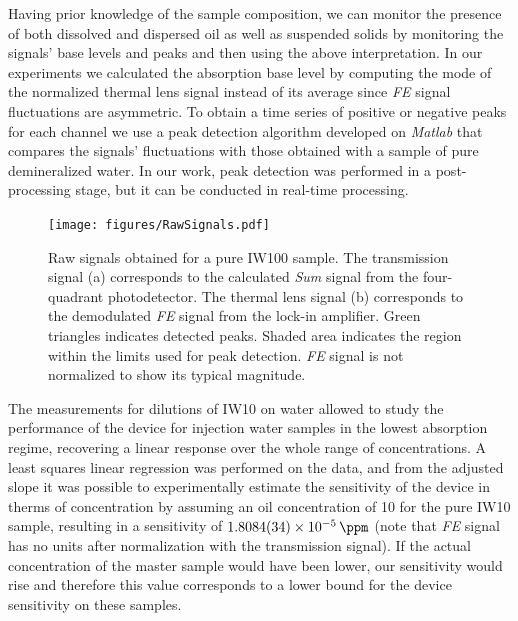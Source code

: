 \documentclass[9pt,twocolumn,twoside]{osajnl}
\newcommand{\FE}{\textit{FE}}
\newcommand{\Sum}{\textit{Sum}}
\begin{document}
Having prior knowledge of the sample composition, we can monitor the presence of both dissolved and dispersed oil as well as suspended solids by monitoring the signals' base levels and peaks and then using the above interpretation. In our experiments we calculated the absorption base level by computing the mode of the normalized thermal lens signal instead of its average since \FE{} signal fluctuations are asymmetric. To obtain a time series of positive or negative peaks for each channel we use a peak detection algorithm developed on \emph{Matlab} that compares the signals' fluctuations with those obtained with a sample of pure demineralized water. In our work, peak detection was performed in a post-processing stage, but it can be conducted in real-time processing.

\begin{figure}[t!]
	\centering \texttt{[image: figures/RawSignals.pdf]}
	\caption{Raw signals obtained for a pure IW100 sample. The transmission signal (a) corresponds to the calculated \Sum{} signal from the four-quadrant photodetector. The thermal lens signal (b) corresponds to the demodulated \FE{} signal from the lock-in amplifier. Green triangles indicates detected peaks. Shaded area indicates the region within the limits used for peak detection. \FE{} signal is not normalized to show its typical magnitude.}
	\label{fig:RawSignals}
\end{figure}

The measurements for dilutions of IW10 on water allowed to study the performance of the device for injection water samples in the lowest absorption regime, recovering a linear response over the whole range of concentrations. A least squares linear regression was performed on the data, and from the adjusted slope it was possible to experimentally estimate the sensitivity of the device in therms of concentration by assuming an oil concentration of \SI{10}{\ppm} for the pure IW10 sample, resulting in a sensitivity of $\SI{1.8084(34)d-5}{\per\ppm}$ (note that \FE{} signal has no units after normalization with the transmission signal). If the actual concentration of the master sample would have been lower, our sensitivity would rise and therefore this value corresponds to a lower bound for the device sensitivity on these samples.
\end{document}
